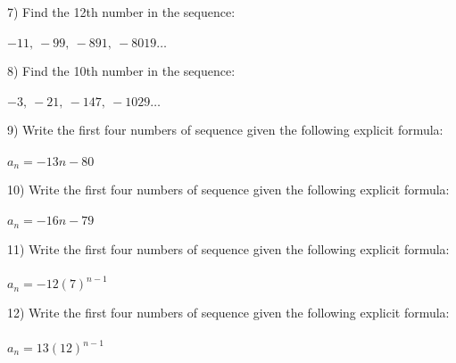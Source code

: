 \documentclass[12pt]{article}
\begin{document}
\begin{minipage}{\textwidth}
\hrulefill






\end{minipage}\begin{minipage}{\textwidth}7) Find the 12th number in the sequence: \\ \\
$-11,~-99,~-891,~-8019\ldots $


\hrulefill




\end{minipage}\begin{minipage}{\textwidth}8) Find the 10th number in the sequence: \\ \\
$-3,~-21,~-147,~-1029\ldots $


\hrulefill





\end{minipage}\begin{minipage}{\textwidth}9) Write the first four numbers of sequence given the following explicit formula: \\ \\
$a_n = -13n -80$ 


\hrulefill



\end{minipage}\begin{minipage}{\textwidth}10) Write the first four numbers of sequence given the following explicit formula: \\ \\
$a_n = -16n -79$ 


\hrulefill





\end{minipage}\begin{minipage}{\textwidth}11) Write the first four numbers of sequence given the following
explicit formula: \\  \\
$a_n = -12(7)^{n-1}$
 

\hrulefill



\end{minipage}\begin{minipage}{\textwidth}12) Write the first four numbers of sequence given the following
explicit formula: \\  \\
$a_n = 13(12)^{n-1}$
 


\end{minipage}
\end{document}
